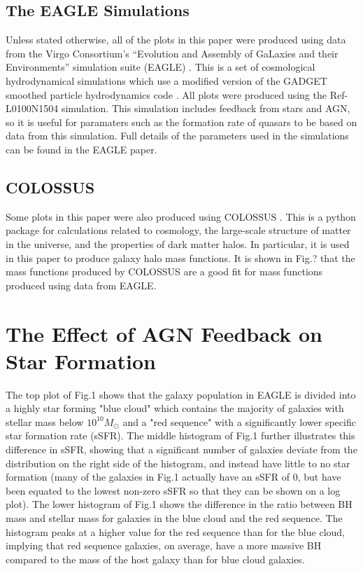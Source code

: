 \documentclass[12pt, twocolumn]{revtex4}    %
\begin{document}
\subsection{The EAGLE Simulations}

Unless stated otherwise, all of the plots in this paper were produced using data from the Virgo Consortium’s “Evolution and Assembly of GaLaxies and their Environments” simulation suite (EAGLE) \cite{EAGLE}. This is a set of cosmological hydrodynamical simulations which use a modified version of the GADGET smoothed particle hydrodynamics code \cite{GADGET}. All plots were produced using the Ref-L0100N1504 simulation. This simulation includes feedback from stars and AGN, so it is useful for paramaters such as the formation rate of quasars to be based on data from this simulation. Full details of the parameters used in the simulations can be found in the EAGLE paper.

\subsection{COLOSSUS}

Some plots in this paper were also produced using COLOSSUS \cite{COLOSSUS}. This is a python package for calculations related to cosmology, the large-scale structure of matter in the universe, and the properties of dark matter halos. In particular, it is used in this paper to produce galaxy halo mass functions. It is shown in Fig.? that the mass functions produced by COLOSSUS are a good fit for mass functions produced using data from EAGLE.

\section{The Effect of AGN Feedback on Star Formation}

The top plot of Fig.1 shows that the galaxy population in EAGLE is divided into a highly star forming "blue cloud" which contains the majority of galaxies with stellar mass below $10^{10}M_\odot$ and a "red sequence" with a significantly lower specific star formation rate (sSFR). The middle histogram of Fig.1 further illustrates this difference in sSFR, showing that a significant number of galaxies deviate from the distribution on the right side of the histogram, and instead have little to no star formation (many of the galaxies in Fig.1 actually have an sSFR of 0, but have been equated to the lowest non-zero sSFR so that they can be shown on a log plot). The lower histogram of Fig.1 shows the difference in the ratio between BH mass and stellar mass for galaxies in the blue cloud and the red sequence. The histogram peaks at a higher value for the red sequence than for the blue cloud, implying that red sequence galaxies, on average, have a more massive BH compared to the mass of the host galaxy than for blue cloud galaxies.\par
\end{document}
